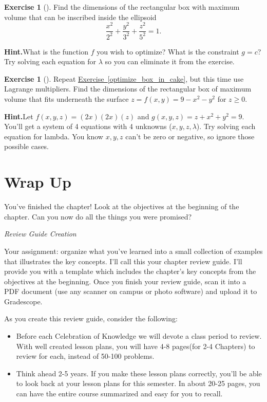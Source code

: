 \documentclass[10pt,]{book}
\theoremstyle{plain}
\theoremstyle{definition}
\theoremstyle{definition}
\theoremstyle{definition}
\theoremstyle{definition}
\newtheorem{exploration}[project]{Exercise}
\theoremstyle{definition}
\numberwithin{equation}{section}
\begin{document}
\begin{exploration}[]\label{exploration-242}
Find the dimensions of the rectangular box with maximum volume that can be inscribed inside the ellipsoid%
\begin{equation*}
\frac{x^2}{2^2}+\frac{y^2}{3^2}+\frac{z^2}{5^2}=1.
\end{equation*}
%
\par\medskip\noindent%
\textbf{Hint.}\quad What is the function \(f\) you wish to optimize? What is the constraint \(g=c\)? Try solving each equation for \(\lambda\) so you can eliminate it from the exercise.%
\end{exploration}
\begin{exploration}[]\label{exploration-243}
Repeat \hyperref[optimize_box_in_cake]{Exercise~\ref{optimize_box_in_cake}}, but this time use Lagrange multipliers. Find the dimensions of the rectangular box of maximum volume that fits underneath the surface \(z=f(x,y)=9-x^2-y^2\) for \(z\geq 0\).%
\par\medskip\noindent%
\textbf{Hint.}\quad Let \(f(x,y,z) = (2x)(2x)(z)\) and \(g(x,y,z)=z+x^2+y^2=9\). You'll get a system of 4 equations with 4 unknowns (\(x,y,z,\lambda\)). Try solving each equation for lambda. You know \(x,y,z\) can't be zero or negative, so ignore those possible cases.%
\end{exploration}
\section*{Wrap Up}
You've finished the chapter! Look at the objectives at the beginning of the chapter. Can you now do all the things you were promised?%
\par
\emph{Review Guide Creation}%
\par
Your assignment: organize what you've learned into a small collection of examples that illustrates the key concepts. I'll call this your chapter review guide. I'll provide you with a template which includes the chapter's key concepts from the objectives at the beginning. Once you finish your review guide, scan it into a PDF document (use any scanner on campus or photo software) and upload it to Gradescope. %
\par
As you create this review guide, consider the following: \leavevmode%
\begin{itemize}[label=\textbullet]
\item{}Before each Celebration of Knowledge  we will devote a class period to review. With well created lesson plans, you will have 4-8 pages(for 2-4 Chapters) to review for each, instead of 50-100 problems.%
\item{}Think ahead 2-5 years. If you make these lesson plans correctly, you'll be able to look back at your lesson plans for this semester. In about 20-25 pages, you can have the entire course summarized and easy for you to recall.%
\end{itemize}
%
\typeout{************************************************}
\typeout{************************************************}
\end{document}
